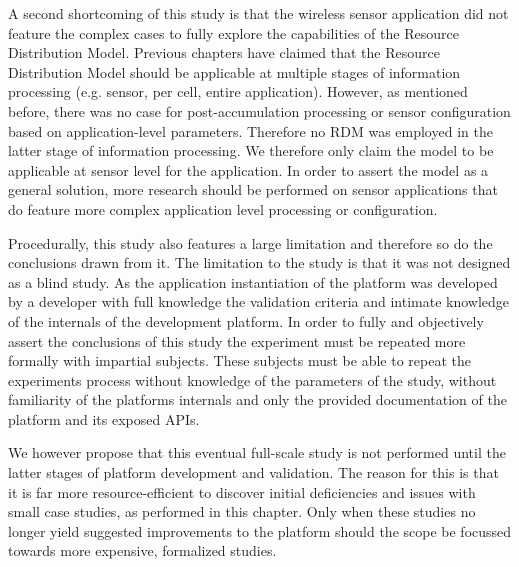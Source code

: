 A second shortcoming of this study is that the \sensit wireless sensor application did not feature the complex cases to fully explore the capabilities of the Resource Distribution Model. Previous chapters have claimed that the Resource Distribution Model should be applicable at multiple stages of information processing (e.g. sensor, per cell, entire application). However, as mentioned before, there was no case for post-accumulation processing or sensor configuration based on application-level parameters. Therefore no RDM was employed in the latter stage of information processing. We therefore only claim the model to be applicable at sensor level for the \sensit application. In order to assert the model as a general solution, more research should be performed on sensor applications that do feature more complex application level processing or configuration.

Procedurally, this study also features a large limitation and therefore so do the conclusions drawn from it. The limitation to the study is that it was not designed as a blind study. As the application instantiation of the platform was developed by a developer with full knowledge the validation criteria and intimate knowledge of the internals of the development platform. In order to fully and objectively assert the conclusions of this study the experiment must be repeated more formally with impartial subjects. These subjects must be able to repeat the experiments process without knowledge of the parameters of the study, without familiarity of the platforms internals and only the provided documentation of the platform and its exposed APIs.

We however propose that this eventual full-scale study is not performed until the latter stages of platform development and validation. The reason for this is that it is far more resource-efficient to discover initial deficiencies and issues with small case studies, as performed in this chapter. Only when these studies no longer yield suggested improvements to the platform should the scope be focussed towards more expensive, formalized studies.